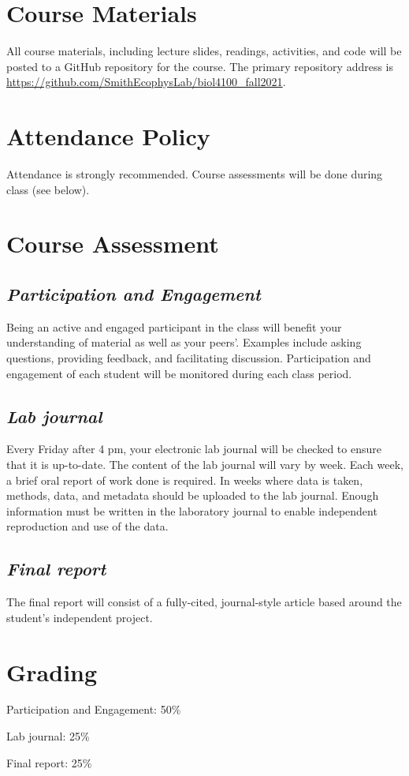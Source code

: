 \documentclass[12pt, notitlepage]{article}   	%
\begin{document}
{\section{Course Materials}
All course materials, including lecture slides, readings, activities, and code 
will be posted to a GitHub repository for the course.
The primary repository address is
\url{https://github.com/SmithEcophysLab/biol4100_fall2021}.

\section{Attendance Policy}
Attendance is strongly recommended. 
Course assessments will be done during class (see below).

\section{Course Assessment}
\subsection{\textit{Participation and Engagement}}
Being an active and engaged participant in the class will benefit your understanding
of material as well as your peers'. Examples include asking questions, providing feedback,
and facilitating discussion. Participation and engagement of each student will be monitored
during each class period.

\subsection{\textit{Lab journal}}
Every Friday after 4 pm, your electronic lab journal will be checked to ensure that it 
is up-to-date. The content of the lab journal will vary by week. 
Each week, a brief oral report of work done is required. 
In weeks where data is taken, methods, data, and metadata 
should be uploaded to the lab journal. Enough information must be written in the 
laboratory journal to enable independent reproduction and use of the data.

\subsection{\textit{Final report}}
The final report will consist of a fully-cited, journal-style article based around the 
student’s independent project.

\section{Grading}
Participation and Engagement: 50\% \par
Lab journal: 25\% \par
Final report: 25\% \par

}
\end{document}

